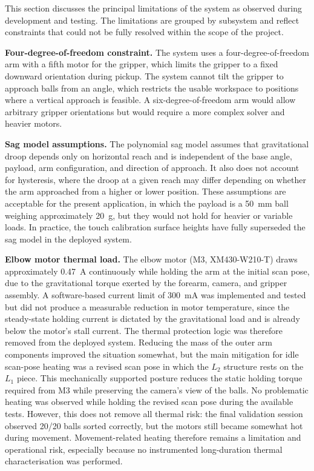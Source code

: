 \label{sec:limitations}

This section discusses the principal limitations of the system
as observed during development and testing. The limitations are
grouped by subsystem and reflect constraints that could not be
fully resolved within the scope of the project.


\textbf{Four-degree-of-freedom constraint.} The system uses a
four-degree-of-freedom arm with a fifth motor for the gripper,
which limits the gripper to a fixed downward orientation during pickup. The system
cannot tilt the gripper to approach balls from an angle, which
restricts the usable workspace to positions where a vertical
approach is feasible. A six-degree-of-freedom arm would allow
arbitrary gripper orientations but would require a more complex
solver and heavier motors.

\textbf{Sag model assumptions.} The polynomial sag model
assumes that gravitational droop depends only on horizontal
reach and is independent of the base angle, payload, arm
configuration, and direction of approach. It also does not
account for hysteresis, where the droop at a given reach may
differ depending on whether the arm approached from a higher
or lower position. These assumptions are acceptable for the
present application, in which the payload is a 50~mm ball
weighing approximately 20~g, but they would not hold for
heavier or variable loads. In practice, the touch calibration
surface heights have fully superseded the sag model in the
deployed system.

\textbf{Elbow motor thermal load.} The elbow motor
(M3, XM430-W210-T) draws approximately 0.47~A continuously
while holding the arm at the initial scan pose, due to the
gravitational torque exerted by the forearm, camera, and
gripper assembly. A software-based current limit of 300~mA
was implemented and tested but did not produce a measurable
reduction in motor temperature, since the steady-state holding
current is dictated by the gravitational load and is already
below the motor's stall current. The thermal protection logic
was therefore removed from the deployed system. Reducing the mass of the
outer arm components improved the situation somewhat, but the main
mitigation for idle scan-pose heating was a revised scan pose in which
the $L_2$ structure rests on the $L_1$ piece. This mechanically supported
posture reduces the static holding torque required from M3 while
preserving the camera's view of the balls. No problematic heating was
observed while holding the revised scan pose during the available tests.
However, this does not remove all thermal risk: the final validation
session observed 20/20 balls sorted correctly, but the motors still
became somewhat hot during movement. Movement-related heating therefore
remains a limitation and operational risk, especially because no
instrumented long-duration thermal characterisation was performed.

